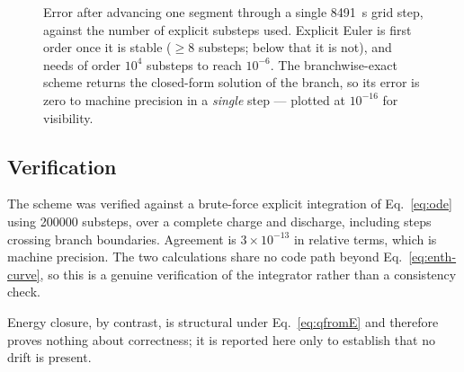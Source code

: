 \begin{figure}[htbp]
\centering
{}
\caption{Error after advancing one segment through a single \SI{8491}{\second}
grid step, against the number of explicit substeps used. Explicit Euler is
first order once it is stable ($\ge 8$ substeps; below that it is not), and
needs of order $10^{4}$ substeps to reach $10^{-6}$. The branchwise-exact
scheme returns the closed-form solution of the branch, so its error is zero to
machine precision in a \emph{single} step --- plotted at $10^{-16}$ for
visibility.}
\label{fig:convergence}
\end{figure}


\subsection{Verification}
\label{sec:verification}

The scheme was verified against a brute-force explicit integration of
Eq.~\eqref{eq:ode} using \num{200000} substeps, over a complete charge and
discharge, including steps crossing branch boundaries. Agreement is
$3\times10^{-13}$ in relative terms, which is machine precision. The two
calculations share no code path beyond Eq.~\eqref{eq:enth-curve}, so this is a
genuine verification of the integrator rather than a consistency check.

Energy closure, by contrast, is structural under Eq.~\eqref{eq:qfromE} and
therefore proves nothing about correctness; it is reported here only to
establish that no drift is present.

